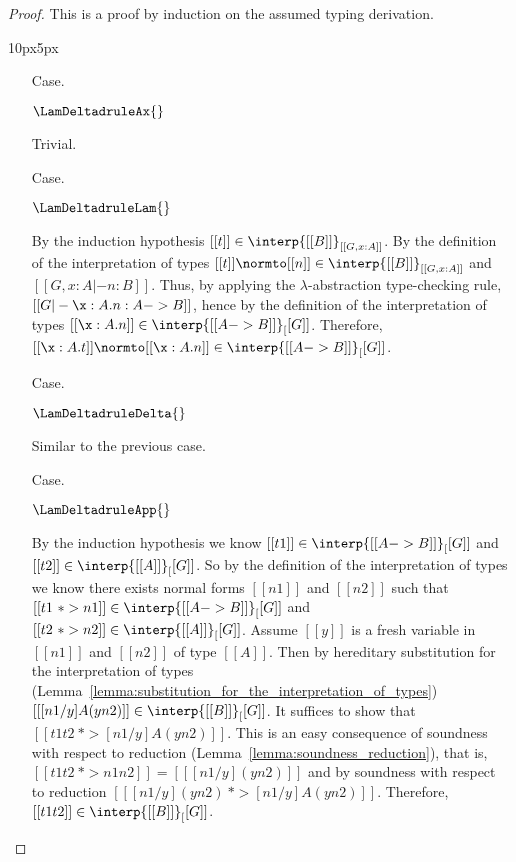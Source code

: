 \newpage
\begin{proof}
  This is a proof by induction on the assumed typing derivation.
  \vspace{-25px}
  \begin{changemargin}{10px}{5px}\noindent
  \begin{itemize}
  \item[Case.] \ \\
    \begin{center}
      $\LamDeltadruleAx{}$
    \end{center}
    Trivial.
    
  \item[Case.] \ \\
    \begin{center}
      $\LamDeltadruleLam{}$
    \end{center}
    By the induction hypothesis $[[t]] \in \interp{[[B]]}_{[[G,x:A]]}$.  By the definition of the
    interpretation of types $[[t]] \normto [[n]] \in \interp{[[B]]}_{[[G,x:A]]}$ and 
    $[[G, x:A |- n:B]]$.  Thus, by applying the $\lambda$-abstraction type-checking
    rule, $[[G |- \x:A.n:A -> B]]$, hence by the definition of the 
    interpretation of types $[[\x:A.n]] \in \interp{[[A -> B]]}_[[G]]$.  Therefore,
    $[[\x:A.t]] \normto [[\x:A.n]] \in \interp{[[A -> B]]}_[[G]]$.
    
  \item[Case.] \ \\
    \begin{center}
      $\LamDeltadruleDelta{}$
    \end{center}
    Similar to the previous case.
    
  \item[Case.] \ \\
    \begin{center}
      $\LamDeltadruleApp{}$
    \end{center}
    
    By the induction hypothesis we know $[[t1]] \in \interp{[[A -> B]]}_[[G]]$ and $[[t2]] \in \interp{[[A]]}_[[G]]$.
    So by the definition of the interpretation of types we know there exists normal forms $[[n1]]$ and $[[n2]]$
    such that $[[t1 ~*> n1]] \in \interp{[[A -> B]]}_[[G]]$ and $[[t2 ~*> n2]] \in \interp{[[A]]}_[[G]]$. Assume $[[y]]$ is a fresh
    variable in $[[n1]]$ and $[[n2]]$ of type $[[A]]$.    
    Then by hereditary 
    substitution for the interpretation of types (Lemma~\ref{lemma:substitution_for_the_interpretation_of_types}) 
    $[[ [n1/y] A (y n2)]] \in \interp{[[B]]}_[[G]]$.  
    It suffices to show that $[[t1 t2 ~*> [n1/y] A (y n2)]]$.  This is an easy consequence of soundness with respect
    to reduction (Lemma~\ref{lemma:soundness_reduction}), that is, $[[t1 t2 ~*> n1 n2]] = [[ [n1/y](y n2)]]$ 
    and by soundness with respect to reduction $[[ [n1/y](y n2) ~*> [n1/y] A (y n2)]]$.  Therefore, 
    $[[t1 t2]] \in \interp{[[B]]}_[[G]]$.  
  \end{itemize}
  \end{changemargin}
\end{proof}

